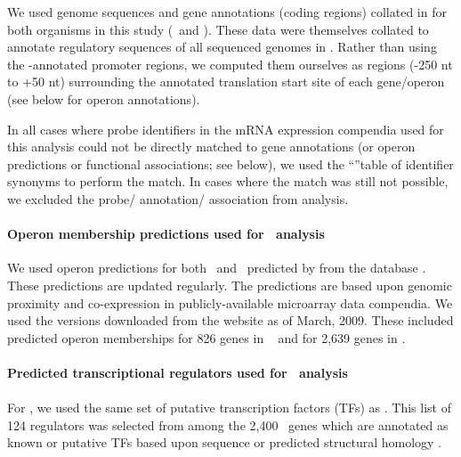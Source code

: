We used genome sequences and gene annotations (coding regions) collated in  \cite{van_helden_web_2000} for both organisms in this study (\halo~and \eco). These data were themselves collated to annotate regulatory sequences of all sequenced genomes in . Rather than using the -annotated promoter regions, we computed them ourselves as regions (-250 nt to +50 nt) surrounding the annotated translation start site of each gene/operon (see below for operon annotations).

In all cases where probe identifiers in the mRNA expression compendia used for this analysis could not be directly matched to gene annotations (or operon predictions or functional associations; see below), we used the  ``''table of identifier synonyms to perform the match. In cases where the match was still not possible, we excluded the probe/ annotation/ association from analysis.

\paragraph{Operon membership predictions used for \cm~analysis}

We used operon predictions for both \halo~and \eco~predicted by \cite{price_novel_2005} from the  database \cite{alm_microbesonline_2005}. These predictions are updated regularly. The predictions are based upon genomic proximity and co-expression in publicly-available microarray data compendia. We used the versions downloaded from the website as of March, 2009. These included predicted operon memberships for 826 genes in \halo~ and for 2,639 genes in \eco.

\paragraph{Predicted transcriptional regulators used for \nwinf~analysis}

\paragraph{\halo}

For \halo, we used the same set of putative transcription factors (TFs) as \cite{bonneau_inferelator:_2006,bonneau_predictive_2007}. This list of 124 regulators was selected from among the 2,400 \halo\ genes which are annotated as known or putative TFs based upon sequence or predicted structural homology \cite{bonneau_comprehensive_2004}.

